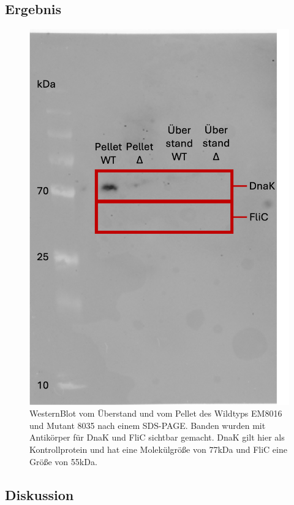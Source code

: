\documentclass[oneside,10pt,a4paper]{report}
\begin{document}
			\subsection{Ergebnis}
				\begin{figure}[H]
				\centering
				\includegraphics[scale=0.5]{Exp6part1.png}
				\caption{WesternBlot vom Überstand und vom Pellet des Wildtyps EM8016 und Mutant 8035 nach einem SDS-PAGE. Banden wurden mit Antikörper für DnaK und FliC sichtbar gemacht. DnaK gilt hier als Kontrollprotein und hat eine Molekülgröße von 77kDa und FliC eine Größe von 55kDa.}
				\label{fig: Westernblot}
			\end{figure}
			
			
			\subsection{Diskussion}
			
\end{document}
